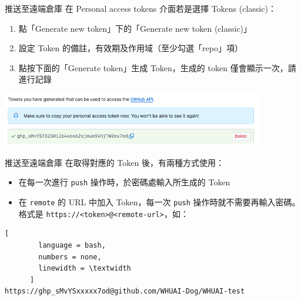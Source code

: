 \documentclass[xetex, unicode, 10pt, aspectratio=169]{beamer}
\begin{document}
\begin{frame}{推送至遠端倉庫}
    在 Personal access tokens 介面若是選擇 Tokens (classic)：
    \begin{enumerate}
        \item 點「Generate new token」下的「Generate new token (classic)」
        \item 設定 Token 的備註，有效期及作用域（至少勾選「repo」項）
        \item 點按下面的「Generate token」生成 Token，生成的 token 僅會顯示一次，請進行記錄
    \end{enumerate}
    \begin{center}
        \includegraphics[width=4.5in]{./img/github-pat-classic.png}
    \end{center}
\end{frame}

\begin{frame}[fragile]{推送至遠端倉庫}
    在取得對應的 Token 後，有兩種方式使用：
    \begin{itemize}
        \item 在每一次進行 \texttt{push} 操作時，於密碼處輸入所生成的 Token
        \item 在 \texttt{remote} 的 URL 中加入 Token，每一次 \texttt{push}
            操作時就不需要再輸入密碼。格式是 \texttt{https://<token>@<remote-url>}，如：
    \end{itemize}
    \begin{lstlisting}[
        language = bash,
        numbers = none,
        linewidth = \textwidth
      ]
https://ghp_sMvYSxxxxx7od@github.com/WHUAI-Dog/WHUAI-test\end{lstlisting}
\end{frame}
\end{document}
